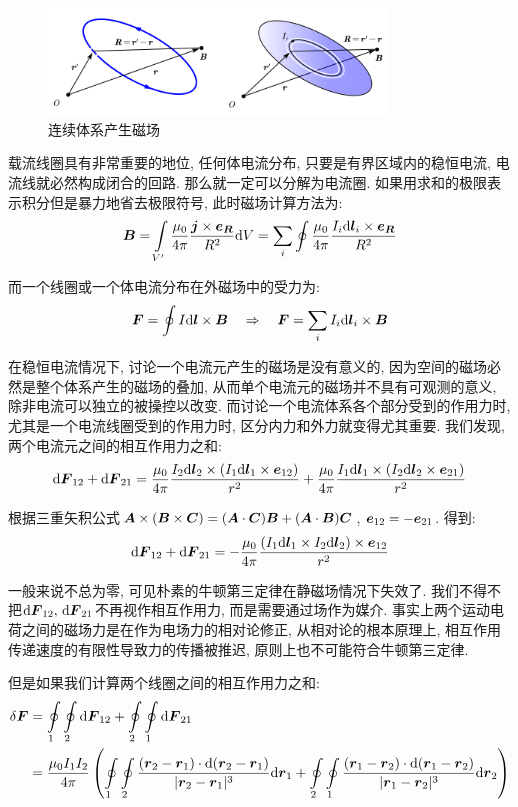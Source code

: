 \begin{figure}[H]
\centering
\includegraphics[width=0.8\textwidth]{image/7-4-7.png}
\caption{连续体系产生磁场}
\end{figure}

载流线圈具有非常重要的地位, 任何体电流分布, 只要是有界区域内的稳恒电流, 电流线就必然构成闭合的回路. 那么就一定可以分解为电流圈. 如果用求和的极限表示积分但是暴力地省去极限符号, 此时磁场计算方法为:
\[\boldsymbol{B}=\int\limits_{V'} \frac{\mu_0}{4\pi}\frac{\boldsymbol{j}\times \boldsymbol{e}_{\boldsymbol{R}}}{R^2}\textrm{d} V=\sum_i \oint \frac{\mu_0}{4\pi}\frac{I_i\textrm{d} \boldsymbol{l}_i\times \boldsymbol{e}_{\boldsymbol{R}}}{R^2}\]

而一个线圈或一个体电流分布在外磁场中的受力为:
\[\boldsymbol{F}=\oint I\textrm{d}\boldsymbol{l}\times \boldsymbol{B}\quad \Rightarrow\quad \boldsymbol{F}=\sum_i I_i\textrm{d}\boldsymbol{l}_i\times \boldsymbol{B}\]

在稳恒电流情况下, 讨论一个电流元产生的磁场是没有意义的, 因为空间的磁场必然是整个体系产生的磁场的叠加, 从而单个电流元的磁场并不具有可观测的意义, 除非电流可以独立的被操控以改变. 而讨论一个电流体系各个部分受到的作用力时, 尤其是一个电流线圈受到的作用力时, 区分内力和外力就变得尤其重要. 我们发现, 两个电流元之间的相互作用力之和:
\[\textrm{d} \boldsymbol{F}_{12}+\textrm{d} \boldsymbol{F}_{21}=\frac{\mu_0}{4\pi}\frac{I_2\textrm{d} \boldsymbol{l}_2\times (I_1\textrm{d} \boldsymbol{l}_1\times \boldsymbol{e}_{12})}{r^2}+\frac{\mu_0}{4\pi}\frac{I_1\textrm{d} \boldsymbol{l}_1\times (I_2\textrm{d} \boldsymbol{l}_2\times \boldsymbol{e}_{21})}{r^2}\]

根据三重矢积公式$\boldsymbol{A}\times(\boldsymbol{B}\times\boldsymbol{C})=(\boldsymbol{A}\cdot\boldsymbol{C})\boldsymbol{B}+(\boldsymbol{A}\cdot\boldsymbol{B})\boldsymbol{C}$, $\boldsymbol{e}_{12}=-\boldsymbol{e}_{21}$. 得到:
\[\textrm{d} \boldsymbol{F}_{12}+\textrm{d} \boldsymbol{F}_{21}=-\frac{\mu_0}{4\pi} \frac{(I_1\textrm{d} \boldsymbol{l}_1\times I_2\textrm{d} \boldsymbol{l}_2)\times \boldsymbol{e}_{12}}{r^2}\]

一般来说不总为零, 可见朴素的牛顿第三定律在静磁场情况下失效了. 我们不得不把$\textrm{d}\boldsymbol{F}_{12},\,\textrm{d} \boldsymbol{F}_{21}$不再视作相互作用力, 而是需要通过场作为媒介. 事实上两个运动电荷之间的磁场力是在作为电场力的相对论修正, 从相对论的根本原理上, 相互作用传递速度的有限性导致力的传播被推迟, 原则上也不可能符合牛顿第三定律.

但是如果我们计算两个线圈之间的相互作用力之和:
\begin{align*}
\delta\boldsymbol{F}&=\oint\limits_1\oint\limits_2\textrm{d} \boldsymbol{F}_{12}+\oint\limits_2\oint\limits_1\textrm{d} \boldsymbol{F}_{21}\\
&=\frac{\mu_0I_1I_2}{4\pi}\left(\oint\limits_1\oint\limits_2\frac{(\boldsymbol{r}_2-\boldsymbol{r}_1)\cdot\textrm{d}(\boldsymbol{r}_2-\boldsymbol{r}_1)}{|\boldsymbol{r}_2-\boldsymbol{r}_1|^3}\textrm{d}\boldsymbol{r}_1+\oint\limits_2\oint\limits_1\frac{(\boldsymbol{r}_1-\boldsymbol{r}_2)\cdot\textrm{d}(\boldsymbol{r}_1-\boldsymbol{r}_2)}{|\boldsymbol{r}_1-\boldsymbol{r}_2|^3}\textrm{d}\boldsymbol{r}_2\right)
\end{align*}

